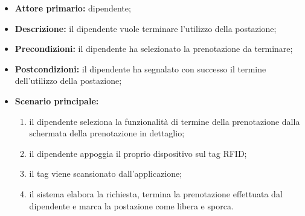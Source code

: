     \begin{itemize}
        \item \textbf{Attore primario:} dipendente;

        \item \textbf{Descrizione:} il dipendente vuole terminare l'utilizzo della postazione;

        \item \textbf{Precondizioni:} il dipendente ha selezionato la prenotazione da terminare;

        \item \textbf{Postcondizioni:} il dipendente ha segnalato con successo il termine dell'utilizzo della postazione;

        \item \textbf{Scenario principale:}
            \begin{enumerate}
                \item il dipendente seleziona la funzionalità di termine della prenotazione dalla schermata della prenotazione in dettaglio;
                \item il dipendente appoggia il proprio dispositivo sul tag RFID;
                \item il tag viene scansionato dall'applicazione;
                \item il sistema elabora la richiesta, termina la prenotazione effettuata dal dipendente e marca la postazione come libera e sporca.
            \end{enumerate}
    \end{itemize} 

